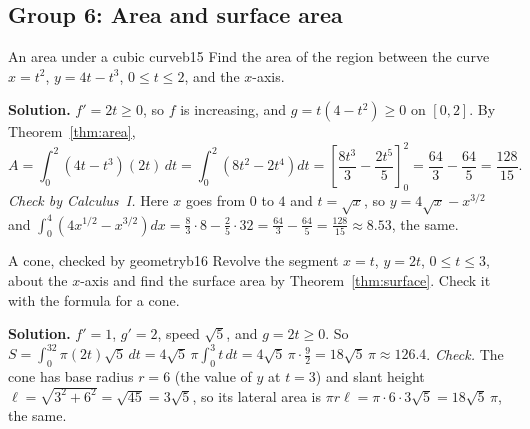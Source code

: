 \documentclass[11pt]{article}
\begin{document}
\subsection*{Group 6: Area and surface area}

\begin{exmp}{An area under a cubic curve}{b15}
Find the area of the region between the curve $x=t^2$, $y=4t-t^3$, $0\le t\le2$, and the $x$-axis.

\textbf{Solution.} $f'=2t\ge0$, so $f$ is increasing, and $g=t(4-t^2)\ge0$ on $[0,2]$. By Theorem~\ref{thm:area},
\[
A=\int_0^2(4t-t^3)(2t)\,dt=\int_0^2\left(8t^2-2t^4\right)dt=\left[\frac{8t^3}3-\frac{2t^5}5\right]_0^2=\frac{64}3-\frac{64}5=\frac{128}{15}.
\]
\emph{Check by Calculus~I.} Here $x$ goes from $0$ to $4$ and $t=\sqrt x$, so $y=4\sqrt x-x^{3/2}$ and $\int_0^4\left(4x^{1/2}-x^{3/2}\right)dx=\frac83\cdot8-\frac25\cdot32=\frac{64}3-\frac{64}5=\frac{128}{15}\approx8.53$, the same.
\end{exmp}

\begin{exmp}{A cone, checked by geometry}{b16}
Revolve the segment $x=t$, $y=2t$, $0\le t\le3$, about the $x$-axis and find the surface area by Theorem~\ref{thm:surface}. Check it with the formula for a cone.

\textbf{Solution.} $f'=1$, $g'=2$, speed $\sqrt5$, and $g=2t\ge0$. So $S=\int_0^32\pi(2t)\sqrt5\,dt=4\sqrt5\,\pi\int_0^3t\,dt=4\sqrt5\,\pi\cdot\frac92=18\sqrt5\,\pi\approx126.4$. \emph{Check.} The cone has base radius $r=6$ (the value of $y$ at $t=3$) and slant height $\ell=\sqrt{3^2+6^2}=\sqrt{45}=3\sqrt5$, so its lateral area is $\pi r\ell=\pi\cdot6\cdot3\sqrt5=18\sqrt5\,\pi$, the same.
\end{exmp}
\end{document}
